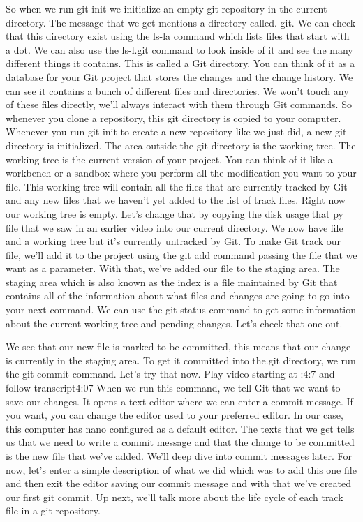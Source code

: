 	So when we run git init we initialize an empty git repository in the current directory. The message that we get mentions a directory called. git. We can check that this directory exist using the ls-la command which lists files that start with a dot. We can also use the ls-l.git command to look inside of it and see the many different things it contains. This is called a Git directory. You can think of it as a database for your Git project that stores the changes and the change history. We can see it contains a bunch of different files and directories. We won't touch any of these files directly, we'll always interact with them through Git commands. So whenever you clone a repository, this git directory is copied to your computer. Whenever you run git init to create a new repository like we just did, a new git directory is initialized. The area outside the git directory is the working tree. The working tree is the current version of your project. You can think of it like a workbench or a sandbox where you perform all the modification you want to your file. This working tree will contain all the files that are currently tracked by Git and any new files that we haven't yet added to the list of track files. Right now our working tree is empty. Let's change that by copying the disk usage that py file that we saw in an earlier video into our current directory. We now have file and a working tree but it's currently untracked by Git. To make Git track our file, we'll add it to the project using the git add command passing the file that we want as a parameter. With that, we've added our file to the staging area. The staging area which is also known as the index is a file maintained by Git that contains all of the information about what files and changes are going to go into your next command. We can use the git status command to get some information about the current working tree and pending changes. Let's check that one out.
	
	We see that our new file is marked to be committed, this means that our change is currently in the staging area. To get it committed into the.git directory, we run the git commit command. Let's try that now.
	Play video starting at :4:7 and follow transcript4:07
	When we run this command, we tell Git that we want to save our changes. It opens a text editor where we can enter a commit message. If you want, you can change the editor used to your preferred editor. In our case, this computer has nano configured as a default editor. The texts that we get tells us that we need to write a commit message and that the change to be committed is the new file that we've added. We'll deep dive into commit messages later. For now, let's enter a simple description of what we did which was to add this one file and then exit the editor saving our commit message and with that we've created our first git commit. Up next, we'll talk more about the life cycle of each track file in a git repository.
	
